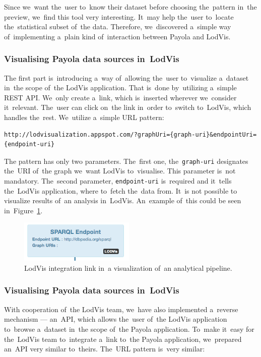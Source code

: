 Since we~want the~user to~know their dataset before choosing the~pattern in~the 
preview, we~find this tool very interesting. It~may help the~user to~locate the~statistical subset of~the data. Therefore, we~discovered a~simple way of~implementing a~plain kind of~interaction between Payola and LodVis.

\subsubsection{Visualising Payola data sources in~LodVis}
The first part is~introducing a~way of~allowing the~user to~visualize a~dataset in~the scope of~the LodVis application. That is~done by~utilizing a~simple REST API. We~only create a~link, which is~inserted wherever we~consider it~relevant. The~user can click on~the link in~order to~switch to~LodVis,
which handles the~rest. We~utilize a~simple URL pattern:

{  \scriptsize
\begin{verbatim}
http://lodvisualization.appspot.com/?graphUri={graph-uri}&endpointUri={endpoint-uri}
\end{verbatim}
}

The pattern has only two parameters. The~first one, the~\texttt{graph-uri} 
designates the~URI of~the graph we~want LodVis to~visualise. This parameter is~not mandatory. The~second parameter, \texttt{endpoint-uri} is~required and it~tells the~LodVis application, where to~fetch the~data from. It~is not possible 
to visualize results of~an analysis in~LodVis. An~example of~this could
be seen in~Figure~\ref{fig:lodvis-int}.

\begin{figure}
	\centering
	\includegraphics[width=55mm]{img/lodvis-int.png}
	\caption{LodVis integration link in~a visualization of~an analytical pipeline.}
	\label{fig:lodvis-int}
\end{figure}


\subsubsection{Visualising Payola data sources in~LodVis}
With cooperation of~the LodVis team, we~have also implemented a~reverse 
mechanism --- an~API, which allows the~user of~the LodVis application to~browse a~dataset in~the scope of~the Payola application. To~make it~easy for the~LodVis 
team to~integrate a~link to~the Payola application, we~prepared an~API very 
similar to~theirs. The~URL pattern is~very similar:

